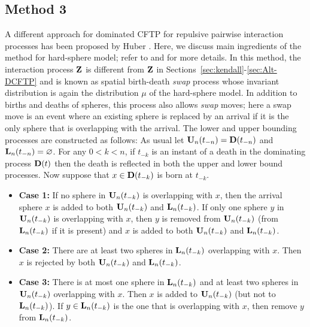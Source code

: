 \documentclass[11pt]{article}
\begin{document}
\subsection{Method 3}
\label{sec:huber}
A different approach for dominated CFTP for repulsive pairwise interaction processes has been proposed by Huber \cite{MH12}. Here, we discuss main ingredients of the method for hard-sphere model;
refer to \cite{MH12} and \cite{MH16} for more details. 
In this method, the interaction process $\mathbf{Z}$ is different from $\mathbf{Z}$ in Sections~\ref{sec:kendall}-\ref{sec:Alt-DCFTP} and is known as spatial birth-death {\it swap} process
whose invariant distribution is again the distribution $\mu$ of the hard-sphere model.
In addition to births and deaths of spheres, this process also allows {\it swap} moves; here a swap move is an event where an existing sphere is replaced by an arrival if it is the only sphere that is overlapping with the arrival. The lower and upper bounding processes are constructed as follows:
As usual let ${\mathbf{U}_n(t_{-n}) =\mathbf{D}(t_{-n})}$ and ${\mathbf{L}_n(t_{-n}) = \varnothing}$. For any ${0 < k < n}$, if $t_{-k}$ is an instant of a death in the dominating process $\mathbf{D}(t)$ then the death is reflected in
both the upper and lower bound processes. Now suppose that $x \in \mathbf{D}(t_{-k})$ is born at $t_{-k}$.
\begin{itemize}
 \item[] {\bf Case 1:} If no sphere in $\mathbf{U}_n(t_{-k})$ is overlapping with $x$, then the arrival sphere $x$ is added to both $\mathbf{U}_n(t_{-k})$ and $\mathbf{L}_n(t_{-k})$.
                       If only one sphere $y$ in $\mathbf{U}_n(t_{-k})$ is overlapping with $x$, then $y$  is removed from $\mathbf{U}_n(t_{-k})$ (from $\mathbf{L}_n(t_{-k})$ if it is present) and $x$ is added to both $\mathbf{U}_n(t_{-k})$ and $\mathbf{L}_n(t_{-k})$.
 \item[] {\bf Case 2:} There are at least two spheres in $\mathbf{L}_n(t_{-k})$ overlapping with $x$. Then $x$ is rejected by both $\mathbf{U}_n(t_{-k})$ and $\mathbf{L}_n(t_{-k})$.
 \item[] {\bf Case 3:} There is at most one sphere in $\mathbf{L}_n(t_{-k})$ and at least two spheres in $\mathbf{U}_n(t_{-k})$ overlapping with $x$.  Then $x$ is added to $\mathbf{U}_n(t_{-k})$ (but not to $\mathbf{L}_n(t_{-k})$). If $y \in \mathbf{L}_n(t_{-k})$ is the one that is overlapping with $x$, then  remove $y$ from $\mathbf{L}_n(t_{-k})$.
\end{itemize}
\end{document}
